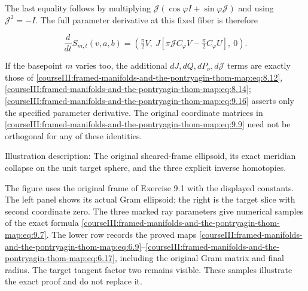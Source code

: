 The last equality follows by multiplying \(\mathcal J(\cos\varphi I+\sin\varphi\mathcal J)\) and using \(\mathcal J^2=-I\). The full parameter derivative at this fixed fiber is therefore

\begin{equation}
\frac{d}{dt}S_{m,t}(v,a,b)=
 \left(\tfrac\pi2 V,\
   J\left[\pi\mathcal J C_\varphi V
                      -\tfrac\pi2 C_\varphi U\right],\
   0\right).
 \label{courseIII:framed-manifolds-and-the-pontryagin-thom-map:eq:9.16}
\end{equation}

If the basepoint \(m\) varies too, the additional \(dJ,dQ,dP_\nu,d\mathcal J\) terms are exactly those of \eqref{courseIII:framed-manifolds-and-the-pontryagin-thom-map:eq:8.12}, \eqref{courseIII:framed-manifolds-and-the-pontryagin-thom-map:eq:8.14}; \eqref{courseIII:framed-manifolds-and-the-pontryagin-thom-map:eq:9.16} asserts only the specified parameter derivative. The original coordinate matrices in \eqref{courseIII:framed-manifolds-and-the-pontryagin-thom-map:eq:9.9} need not be orthogonal for any of these identities.

Illustration description: The original sheared-frame ellipsoid, its exact meridian collapse on the unit target sphere, and the three explicit inverse homotopies.

The figure uses the original frame of Exercise 9.1 with the displayed constants. The left panel shows its actual Gram ellipsoid; the right is the target slice with second coordinate zero. The three marked ray parameters give numerical samples of the exact formula \eqref{courseIII:framed-manifolds-and-the-pontryagin-thom-map:eq:9.7}. The lower row records the proved maps \eqref{courseIII:framed-manifolds-and-the-pontryagin-thom-map:eq:6.9}--\eqref{courseIII:framed-manifolds-and-the-pontryagin-thom-map:eq:6.17}, including the original Gram matrix and final radius. The target tangent factor two remains visible. These samples illustrate the exact proof and do not replace it.

\label{courseIII:framed-manifolds-and-the-pontryagin-thom-map:pt-sources-and-scope}
